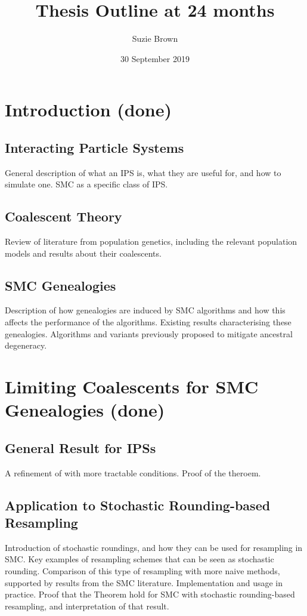 \documentclass{article}
\title{Thesis Outline at 24 months}
\author{Suzie Brown}
\date{30 September 2019}
\begin{document}
\maketitle

\section{Introduction (done)}
\subsection{Interacting Particle Systems}
General description of what an IPS is, what they are useful for, and how to simulate one. SMC as a specific class of IPS.
\subsection{Coalescent Theory}
Review of literature from population genetics, including the relevant population models and results about their coalescents.
\subsection{SMC Genealogies}
Description of how genealogies are induced by SMC algorithms and how this affects the performance of the algorithms. Existing results characterising these genealogies. Algorithms and variants previously proposed to mitigate ancestral degeneracy.

\section{Limiting Coalescents for SMC Genealogies (done)}
\subsection{General Result for IPSs}
A refinement of \citet[Theorem 1]{koskela2018} with more tractable conditions. Proof of the theroem. 
\subsection{Application to Stochastic Rounding-based Resampling}
Introduction of stochastic roundings, and how they can be used for resampling in SMC. Key examples of resampling schemes that can be seen as stochastic rounding. Comparison of this type of resampling with more naive methods, supported by results from the SMC literature. Implementation and usage in practice. Proof that the Theorem hold for SMC with stochastic rounding-based resampling, and interpretation of that result.
\end{document}
